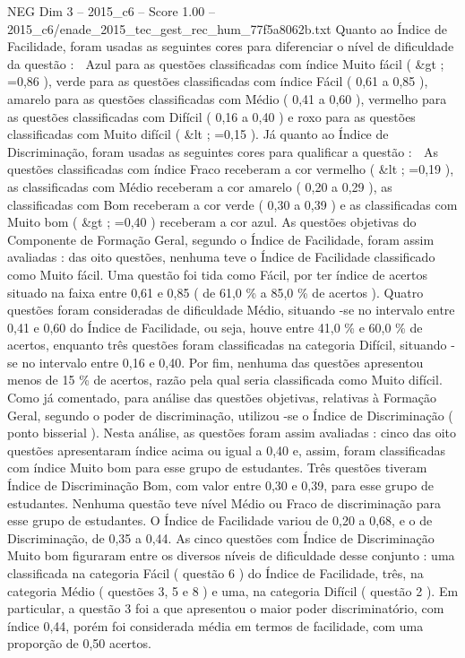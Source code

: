\begin{textsample}{NEG Dim 3 – 2015\_c6 – Score 1.00 – 2015\_c6/enade\_2015\_tec\_gest\_rec\_hum\_77f5a8062b.txt}
Quanto ao Índice de Facilidade, foram usadas as seguintes cores para diferenciar o nível de dificuldade da questão :  Azul para as questões classificadas com índice Muito fácil ( \&gt ; =0,86 ), verde para as questões classificadas com índice Fácil ( 0,61 a 0,85 ), amarelo para as questões classificadas com Médio ( 0,41 a 0,60 ), vermelho para as questões classificadas com Difícil ( 0,16 a 0,40 ) e roxo para as questões classificadas com Muito difícil ( \&lt ; =0,15 ).
Já quanto ao Índice de Discriminação, foram usadas as seguintes cores para qualificar a questão :  As questões classificadas com índice Fraco receberam a cor vermelho ( \&lt ; =0,19 ), as classificadas com Médio receberam a cor amarelo ( 0,20 a 0,29 ), as classificadas com Bom receberam a cor verde ( 0,30 a 0,39 ) e as classificadas com Muito bom ( \&gt ; =0,40 ) receberam a cor azul.
As questões objetivas do Componente de Formação Geral, segundo o Índice de Facilidade, foram assim avaliadas : das oito questões, nenhuma teve o Índice de Facilidade classificado como Muito fácil.
Uma questão foi tida como Fácil, por ter índice de acertos situado na faixa entre 0,61 e 0,85 ( de 61,0 \% a 85,0 \% de acertos ).
Quatro questões foram consideradas de dificuldade Médio, situando -se no intervalo entre 0,41 e 0,60 do Índice de Facilidade, ou seja, houve entre 41,0 \% e 60,0 \% de acertos, enquanto três questões foram classificadas na categoria Difícil, situando -se no intervalo entre 0,16 e 0,40.
Por fim, nenhuma das questões apresentou menos de 15 \% de acertos, razão pela qual seria classificada como Muito difícil.
Como já comentado, para análise das questões objetivas, relativas à Formação Geral, segundo o poder de discriminação, utilizou -se o Índice de Discriminação ( ponto bisserial ).
Nesta análise, as questões foram assim avaliadas : cinco das oito questões apresentaram índice acima ou igual a 0,40 e, assim, foram classificadas com índice Muito bom para esse grupo de estudantes.
Três questões tiveram Índice de Discriminação Bom, com valor entre 0,30 e 0,39, para esse grupo de estudantes.
Nenhuma questão teve nível Médio ou Fraco de discriminação para esse grupo de estudantes.
O Índice de Facilidade variou de 0,20 a 0,68, e o de Discriminação, de 0,35 a 0,44.
As cinco questões com Índice de Discriminação Muito bom figuraram entre os diversos níveis de dificuldade desse conjunto : uma classificada na categoria Fácil ( questão 6 ) do Índice de Facilidade, três, na categoria Médio ( questões 3, 5 e 8 ) e uma, na categoria Difícil ( questão 2 ).
Em particular, a questão 3 foi a que apresentou o maior poder discriminatório, com índice 0,44, porém foi considerada média em termos de facilidade, com uma proporção de 0,50 acertos.

\end{textsample}
